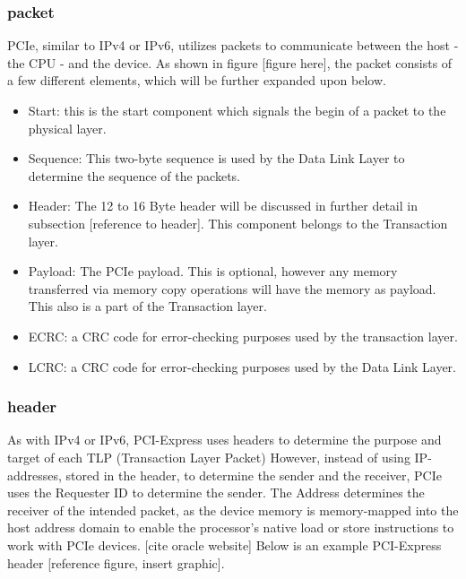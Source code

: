\subsubsection{packet}
PCIe, similar to IPv4 or IPv6, utilizes packets to communicate between the host - the CPU - and the device. As shown in figure [figure here], the packet consists of a few different elements, which will be further expanded upon below. 
\begin{itemize}
\item Start: this is the start component which signals the begin of a packet to the physical layer.
\item Sequence: This two-byte sequence is used by the Data Link Layer to determine the sequence of the packets.
\item Header: The 12 to 16 Byte header will be discussed in further detail in subsection [reference to header]. This component belongs to the Transaction layer.
\item Payload: The PCIe payload. This is optional, however any memory transferred via memory copy operations will have the memory as payload. This also is a part of the Transaction layer.
\item ECRC: a CRC code for error-checking purposes used by the transaction layer.
\item LCRC: a CRC code for error-checking purposes used by the Data Link Layer.
\end{itemize}


\subsubsection{header}
As with IPv4 or IPv6, PCI-Express uses headers to determine the purpose and target of each TLP (Transaction Layer Packet)
However, instead of using IP-addresses, stored in the header, to determine the sender and the receiver, PCIe uses the Requester ID to determine the sender. The Address determines the receiver of the intended packet, as the device memory is memory-mapped into the host address domain to enable the processor's native load or store instructions to work with PCIe devices. [cite oracle website] Below is an example PCI-Express header [reference figure, insert graphic].

